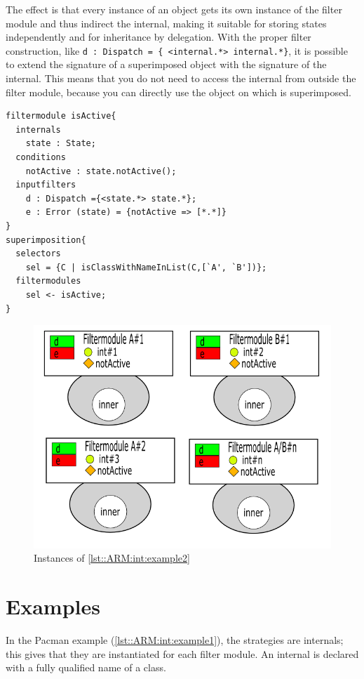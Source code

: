 The effect is that every instance of an object gets its own instance of the filter module and thus indirect the internal, making it suitable for storing states independently and for inheritance by delegation. 
With the proper filter construction, like \lstinline!d : Dispatch = { <internal.*> internal.*}!, it is possible to extend the signature of a superimposed object with the signature of the internal.
This means that you do not need to access the internal from outside the filter module, because you can directly
use the object on which is superimposed.

\begin{lstlisting}[caption = {Example 2, a filter module to hold a state}, label = lst::ARM:int:example2,
style=listing, language=ComposeStar, float = tpb]
filtermodule isActive{
  internals
    state : State;
  conditions
    notActive : state.notActive();
  inputfilters
    d : Dispatch ={<state.*> state.*};
    e : Error (state) = {notActive => [*.*]}
}
superimposition{
  selectors
    sel = {C | isClassWithNameInList(C,[`A', `B'])};
  filtermodules
    sel <- isActive;
}
\end{lstlisting}

\begin{figure}[tpb]
	\centering
	\includegraphics[style=thirdheight]{images/ARM-internalInitialization}
	\caption{Instances of \autoref{lst::ARM:int:example2}}
	\label{fig::arm::int:initialisation}
\end{figure}

\section{Examples}
In the Pacman example (\autoref{lst::ARM:int:example1}), the strategies are internals; this gives that they are instantiated for each filter module. 
An internal is declared with a fully qualified name of a class.

